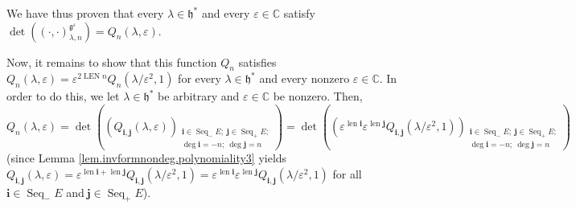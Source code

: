 \documentclass[etingof-lie.tex]{subfiles}
\begin{document}
We have thus proven that every $\lambda\in\mathfrak{h}^{\ast}$ and every
$\varepsilon\in\mathbb{C}$ satisfy $\det\left(  \left(  \cdot,\cdot\right)
_{\lambda,n}^{\mathfrak{g}^{\varepsilon}}\right)  =Q_{n}\left(  \lambda
,\varepsilon\right)  $.

Now, it remains to show that this function $Q_{n}$ satisfies $Q_{n}\left(
\lambda,\varepsilon\right)  =\varepsilon^{2\operatorname*{LEN}n}Q_{n}\left(
\lambda/\varepsilon^{2},1\right)  $ for every $\lambda\in\mathfrak{h}^{\ast}$
and every nonzero $\varepsilon\in\mathbb{C}$. In order to do this, we let
$\lambda\in\mathfrak{h}^{\ast}$ be arbitrary and $\varepsilon\in\mathbb{C}$ be
nonzero. Then,
\begin{equation}
Q_{n}\left(  \lambda,\varepsilon\right)  =\det\left(  \left(  Q_{\mathbf{i}%
,\mathbf{j}}\left(  \lambda,\varepsilon\right)  \right)
_{\substack{\mathbf{i}\in\operatorname*{Seq}\nolimits_{-}E;\ \mathbf{j}%
\in\operatorname*{Seq}\nolimits_{+}E;\\\deg\mathbf{i}=-n;\ \deg\mathbf{j}%
=n}}\right)  =\det\left(  \left(  \varepsilon^{\operatorname*{len}\mathbf{i}%
}\varepsilon^{\operatorname*{len}\mathbf{j}}Q_{\mathbf{i},\mathbf{j}}\left(
\lambda/\varepsilon^{2},1\right)  \right)  _{\substack{\mathbf{i}%
\in\operatorname*{Seq}\nolimits_{-}E;\ \mathbf{j}\in\operatorname*{Seq}%
\nolimits_{+}E;\\\deg\mathbf{i}=-n;\ \deg\mathbf{j}=n}}\right)
\label{pf.invformnondeg.polynomiality5.1}%
\end{equation}
(since Lemma \ref{lem.invformnondeg.polynomiality3} yields $Q_{\mathbf{i}%
,\mathbf{j}}\left(  \lambda,\varepsilon\right)  =\varepsilon
^{\operatorname*{len}\mathbf{i}+\operatorname*{len}\mathbf{j}}Q_{\mathbf{i}%
,\mathbf{j}}\left(  \lambda/\varepsilon^{2},1\right)  =\varepsilon
^{\operatorname*{len}\mathbf{i}}\varepsilon^{\operatorname*{len}\mathbf{j}%
}Q_{\mathbf{i},\mathbf{j}}\left(  \lambda/\varepsilon^{2},1\right)  $ for all
$\mathbf{i}\in\operatorname*{Seq}\nolimits_{-}E$ and$\ \mathbf{j}%
\in\operatorname*{Seq}\nolimits_{+}E$).
\end{document}
